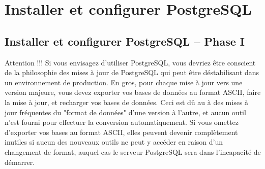 
\chapter{Installer et configurer PostgreSQL}
\label{_ChapterStart10}

\section{Installer et configurer PostgreSQL -- Phase I}

Attention !!! Si vous envisagez d'utiliser PostgreSQL, vous devriez 
\^etre conscient de la philosophie des mises \`a jour de PostgreSQL qui 
peut \^etre d\'estabilisant dans un environnement de 
production. En gros, pour chaque mise \`a jour vers une version majeure, 
vous devez exporter vos bases de donn\'ees au format ASCII, faire la 
mise \`a jour, et recharger vos bases de donn\'ees. Ceci est d\^u au \`a des 
mises \`a jour fr\'equentes du "format de donn\'ees" d'une version \`a l'autre, 
et aucun outil n'est fourni pour effectuer la conversion automatiquement. 
Si vous omettez d'exporter vos bases au format ASCII, elles peuvent 
devenir compl\`etement inutiles si aucun des nouveaux outils ne peut y 
acc\'eder en raison d'un changement de format, auquel cas le serveur 
PostgreSQL sera dans l'incapacit\'e de d\'emarrer. 

